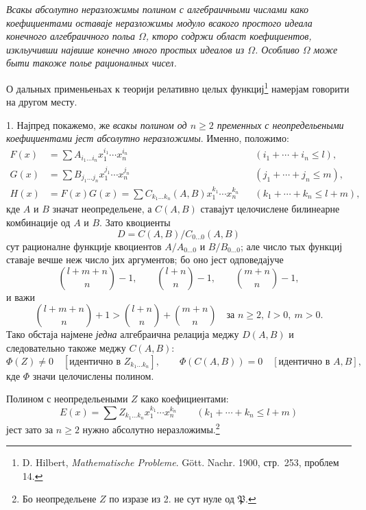 ﻿\documentclass[11pt]{article}
\begin{document}
\emph{Всакы абсолутно неразложимы полином с алгебраичными числами како коефициентами оставаје неразложимы модуло всакого простого идеала конечного алгебраичного польа $\Omega$, кторо содржи област коефициентов, изкльучивши највише конечно много простых идеалов из $\Omega$. Особливо $\Omega$ може быти такоже полье рационалных чисел.}

О дальных применьеньах к теорији релативно целых функциј\footnote{D. Hilbert, \emph{Mathematische Probleme}. Gött. Nachr. 1900, стр.~253, проблем 14.} намерјам говорити на другом месту.

1. Најпред покажемо, же \emph{всакы полином од $n\ge2$ пременных с неопредельеными коефициентами јест абсолутно неразложимы}. Именно, положимо:
\begin{equation}
\begin{aligned}
F(x)&=\sum A_{i_1\ldots i_n}x_1^{i_1}\cdots x_n^{i_n} &&(i_1+\cdots+i_n\le l),\\
G(x)&=\sum B_{j_1\ldots j_n}x_1^{j_1}\cdots x_n^{j_n} &&(j_1+\cdots+j_n\le m),\\
H(x)&=F(x)G(x)=\sum C_{k_1\ldots k_n}(A,B)x_1^{k_1}\cdots x_n^{k_n} &&(k_1+\cdots+k_n\le l+m),
\end{aligned}
\tag{1}
\end{equation}
кде $A$ и $B$ значат неопредельене, а $C(A,B)$ ставајут целочислене билинеарне комбинације од $A$ и $B$. Зато квоциенты
\[
D=C(A,B)/C_{0\ldots0}(A,B)
\]
сут рационалне функције квоциентов $A/A_{0\ldots0}$ и $B/B_{0\ldots0}$; але число тых функциј ставаје вечше неж число јих аргументов; бо оно јест одповедајуче
\[
\binom{l+m+n}{n}-1,
\qquad
\binom{l+n}{n}-1,
\qquad
\binom{m+n}{n}-1,
\]
и важи
\[
\binom{l+m+n}{n}+1>
\binom{l+n}{n}+\binom{m+n}{n}
\quad\text{за } n\ge2,\ l>0,\ m>0.
\]
Тако обстаја најмене \emph{једна} алгебраична релација меджу $D(A,B)$ и следовательно такоже меджу $C(A,B)$:
\begin{equation}
 \Phi(Z)\ne0\quad[\text{идентично в }Z_{k_1\ldots k_n}],
 \qquad
 \Phi(C(A,B))=0\quad[\text{идентично в }A,B],
\tag{2}
\end{equation}
кде $\Phi$ значи целочислены полином.

Полином с неопредельеными $Z$ како коефициентами:
\begin{equation}
 E(x)=\sum Z_{k_1\ldots k_n}x_1^{k_1}\cdots x_n^{k_n}
 \qquad(k_1+\cdots+k_n\le l+m)
\tag{3}
\end{equation}
јест зато за $n\ge2$ нужно абсолутно неразложимы.\footnote{Бо неопредельене $Z$ по изразе из 2. не сут нуле од $\mathfrak P$.}
\end{document}
